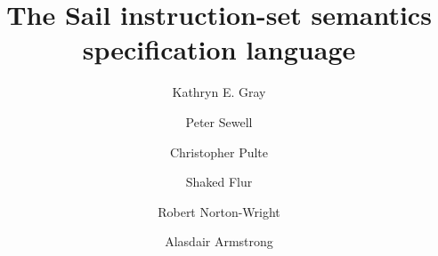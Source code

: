 \documentclass[a4paper]{article}
\begin{document}


\title{The Sail instruction-set semantics specification language}

\author{Kathryn E. Gray \and Peter Sewell \and Christopher Pulte \and
  Shaked Flur \and Robert Norton-Wright \and Alasdair Armstrong}

\maketitle

\tableofcontents













\end{document}
